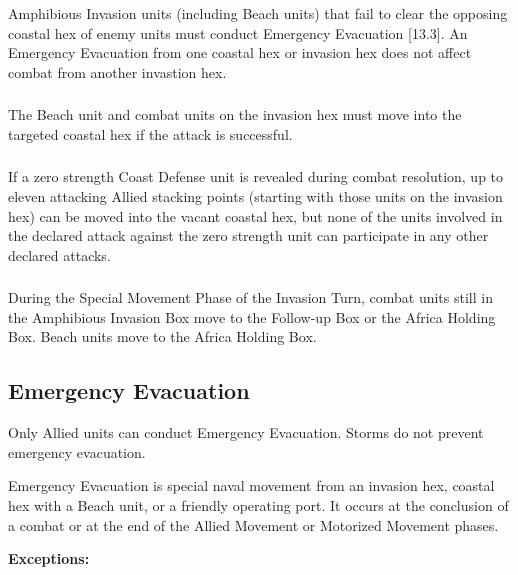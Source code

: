 \subsubsection{} Amphibious Invasion units (including Beach units) that fail to clear the opposing coastal hex of enemy units must conduct Emergency Evacuation [13.3]. An Emergency Evacuation from one coastal hex or invasion hex does not affect combat from another invastion hex.

\subsubsection{} The Beach unit and combat units on the invasion hex must move into the targeted coastal hex if the attack is successful.

\subsubsection{} If a zero strength Coast Defense unit is revealed during combat resolution, up to eleven attacking Allied stacking points (starting with those units on the invasion hex) can be moved into the vacant coastal hex, but none of the units involved in the declared attack against the zero strength unit can participate in any other declared attacks.

\subsubsection{} During the Special Movement Phase of the Invasion Turn, combat units still in the Amphibious Invasion Box move to the Follow-up Box or the Africa Holding Box. Beach units move to the Africa Holding Box.

\subsection{Emergency Evacuation}

Only Allied units can conduct Emergency Evacuation. Storms do not prevent emergency evacuation.

Emergency Evacuation is special naval movement from an invasion hex, coastal hex with a Beach unit, or a friendly operating port. It occurs at the conclusion of a combat or at the end of the Allied Movement or Motorized Movement phases.

\textbf{Exceptions:}

